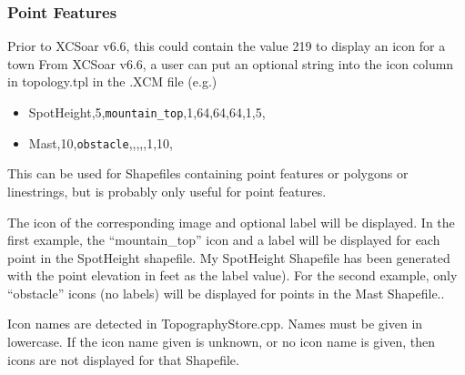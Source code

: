 \subsubsection{Point Features}
Prior to XCSoar v6.6, this could contain the value 219 to display an icon for a town
From XCSoar v6.6, a user can put an optional string into the icon column in topology.tpl in the .XCM file (e.g.)
\begin{itemize}
\item SpotHeight,5,\texttt{mountain\_top},1,64,64,64,1,5,
\item Mast,10,\texttt{obstacle},,,,,1,10,
\end{itemize}
This can be used for Shapefiles containing point features or polygons or linestrings, but is probably only useful for point features.

The icon of the corresponding image and optional label will be displayed. In the first example, 
the ``mountain\_top'' icon and a label will be displayed for each point in the SpotHeight shapefile. My
SpotHeight Shapefile has been generated with the point elevation in feet as the label value). For the second example, only ``obstacle'' icons
(no labels) will be displayed for points in the Mast Shapefile..

Icon names are detected in TopographyStore.cpp. Names must be given in lowercase. If the icon name given is unknown, or no icon name is given, then icons are not displayed for that Shapefile.


